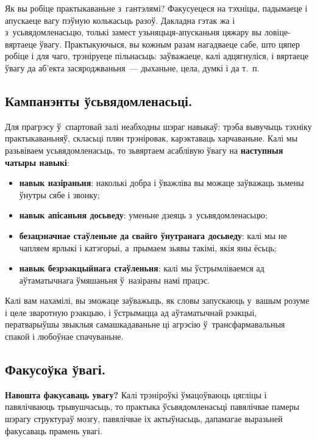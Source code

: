 Як вы робіце практыкаваньне з~гантэлямі? Факусуецеся на тэхніцы, падымаеце і апускаеце вагу пэўную колькасьць разоў. Дакладна гэтак жа і з~усьвядомленасьцю, толькі замест узьняцьця-апусканьня цяжару вы ловіце-вяртаеце ўвагу. Практыкуючыся, вы кожным разам нагадваеце сабе, што цяпер робіце і для чаго, трэніруеце пільнасьць: заўважаеце, калі адцягнуліся, і вяртаеце ўвагу да аб'екта засяроджваньня~--- дыханьне, цела, думкі і да т.~п.

\subsection*{Кампанэнты ўсьвядомленасьці.}

Для прагрэсу ў~спартовай залі неабходны шэраг навыкаў: трэба вывучыць тэхніку практыкаваньняў, скласьці плян трэніровак, карэктаваць харчаваньне. Калі мы разьвіваем усьвядомленасьць, то зьвяртаем асаблівую ўвагу на \textbf{наступныя чатыры навыкі}: 
\begin{itemize}
  \item \textbf{навык назіраньня}: наколькі добра і ўважліва вы можаце заўважаць зьмены ўнутры сябе і звонку;
  \item \textbf{навык апісаньня досьведу}: уменьне дзеяць з~усьвядомленасьцю;
  \item \textbf{безацэначнае стаўленьне да свайго ўнутранага досьведу}: калі мы не чапляем ярлыкі і катэгорыі, а~прымаем зьявы такімі, якія яны ёсьць;
  \item \textbf{навык безрэакцыйнага стаўленьня}: калі мы ўстрымліваемся ад аўтаматычнага ўмяшаньня ў~назіраны намі працэс.
\end{itemize}

Калі вам нахамілі, вы зможаце заўважыць, як словы запускаюць у~вашым розуме і целе зваротную рэакцыю, і ўстрымацца ад аўтаматычнай рэакцыі, ператварыўшы звыклыя самашкадаваньне ці агрэсію ў~трансфармавальныя спакой і любоўнае спачуваньне.


\subsection*{Факусоўка ўвагі.}

\textbf{Навошта факусаваць увагу?} Калі трэніроўкі ўмацоўваюць цягліцы і павялічваюць трывушчасьць, то практыка ўсьвядомленасьці павялічвае памеры шэрагу структураў мозгу, павялічвае іх актыўнасьць, дапамагае выразьней факусаваць прамень увагі.

